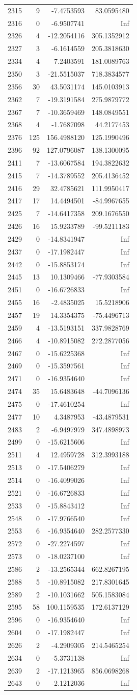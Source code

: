 \documentclass[
]{article}
\begin{document}
\begin{longtable}[]{@{}lrrr@{}}
2315 & 9 & -7.4753593 & 83.0595480\tabularnewline
2316 & 0 & -6.9507741 & Inf\tabularnewline
2326 & 4 & -12.2054116 & 305.1352912\tabularnewline
2327 & 3 & -6.1614559 & 205.3818630\tabularnewline
2334 & 4 & 7.2403591 & 181.0089763\tabularnewline
2350 & 3 & -21.5515037 & 718.3834577\tabularnewline
2356 & 30 & 43.5031174 & 145.0103913\tabularnewline
2362 & 7 & -19.3191584 & 275.9879772\tabularnewline
2367 & 7 & -10.3659469 & 148.0849551\tabularnewline
2368 & 4 & -1.7687098 & 44.2177453\tabularnewline
2376 & 125 & 156.4988120 & 125.1990496\tabularnewline
2396 & 92 & 127.0796087 & 138.1300095\tabularnewline
2411 & 7 & -13.6067584 & 194.3822632\tabularnewline
2415 & 7 & -14.3789552 & 205.4136452\tabularnewline
2416 & 29 & 32.4785621 & 111.9950417\tabularnewline
2417 & 17 & 14.4494501 & -84.9967655\tabularnewline
2425 & 7 & -14.6417358 & 209.1676550\tabularnewline
2426 & 16 & 15.9233789 & -99.5211183\tabularnewline
2429 & 0 & -14.8341947 & Inf\tabularnewline
2437 & 0 & -17.1982447 & Inf\tabularnewline
2442 & 0 & -15.8853174 & Inf\tabularnewline
2445 & 13 & 10.1309466 & -77.9303584\tabularnewline
2451 & 0 & -16.6726833 & Inf\tabularnewline
2455 & 16 & -2.4835025 & 15.5218906\tabularnewline
2457 & 19 & 14.3354375 & -75.4496713\tabularnewline
2459 & 4 & -13.5193151 & 337.9828769\tabularnewline
2466 & 4 & -10.8915082 & 272.2877056\tabularnewline
2467 & 0 & -15.6225368 & Inf\tabularnewline
2469 & 0 & -15.3597561 & Inf\tabularnewline
2471 & 0 & -16.9354640 & Inf\tabularnewline
2474 & 35 & 15.6483648 & -44.7096136\tabularnewline
2475 & 0 & -17.4610254 & Inf\tabularnewline
2477 & 10 & 4.3487953 & -43.4879531\tabularnewline
2483 & 2 & -6.9497979 & 347.4898973\tabularnewline
2499 & 0 & -15.6215606 & Inf\tabularnewline
2511 & 4 & 12.4959728 & 312.3993188\tabularnewline
2513 & 0 & -17.5406279 & Inf\tabularnewline
2514 & 0 & -16.4099026 & Inf\tabularnewline
2521 & 0 & -16.6726833 & Inf\tabularnewline
2533 & 0 & -15.8843412 & Inf\tabularnewline
2548 & 0 & -17.9766540 & Inf\tabularnewline
2553 & 6 & -16.9354640 & 282.2577330\tabularnewline
2572 & 0 & -27.2274597 & Inf\tabularnewline
2573 & 0 & -18.0237100 & Inf\tabularnewline
2586 & 2 & -13.2565344 & 662.8267195\tabularnewline
2588 & 5 & -10.8915082 & 217.8301645\tabularnewline
2589 & 2 & -10.1031662 & 505.1583084\tabularnewline
2595 & 58 & 100.1159535 & 172.6137129\tabularnewline
2596 & 0 & -16.9354640 & Inf\tabularnewline
2604 & 0 & -17.1982447 & Inf\tabularnewline
2626 & 2 & -4.2909305 & 214.5465254\tabularnewline
2634 & 0 & -5.3731138 & Inf\tabularnewline
2639 & 2 & -17.1213965 & 856.0698268\tabularnewline
2643 & 0 & -2.1212036 & Inf\tabularnewline

\end{longtable}
\end{document}
